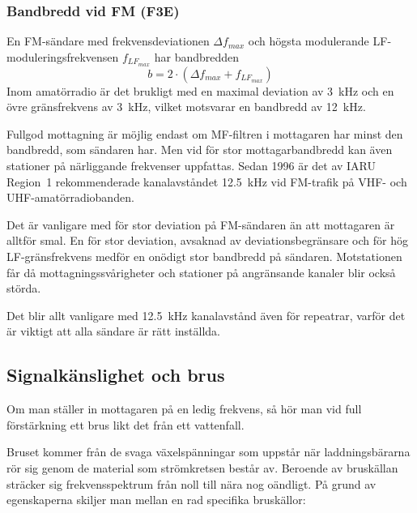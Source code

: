 \subsubsection{Bandbredd vid FM (F3E)}

En FM-sändare med frekvensdeviationen \(\Delta f_{max}\) och högsta
modulerande LF-moduleringsfrekvensen \(f_{LF_{max}}\) har bandbredden
\[ b = 2 \cdot (\Delta f_{max} + f_{LF_{max}}) \]
Inom amatörradio är det brukligt med en maximal deviation av \SI{3}{\kilo\hertz}
och en övre gränsfrekvens av \SI{3}{\kilo\hertz}, vilket motsvarar en bandbredd
av \SI{12}{\kilo\hertz}.

Fullgod mottagning är möjlig endast om MF-filtren i mottagaren har
minst den bandbredd, som sändaren har.
Men vid för stor mottagarbandbredd kan även stationer på närliggande frekvenser
uppfattas.
Sedan 1996 är det av IARU Region~1 rekommenderade kanalavståndet
\SI{12,5}{\kilo\hertz} vid FM-trafik på VHF- och UHF-amatörradiobanden.

Det är vanligare med för stor deviation på FM-sändaren än att
mottagaren är alltför smal.
En för stor deviation, avsaknad av deviationsbegränsare och för hög
LF-gränsfrekvens medför en onödigt stor bandbredd på sändaren.
Motstationen får då mottagningssvårigheter och stationer på angränsande
kanaler blir också störda.

Det blir allt vanligare med \SI{12,5}{\kilo\hertz} kanalavstånd även för
repeatrar, varför det är viktigt att alla sändare är rätt inställda.

\subsection{Signalkänslighet och brus}

Om man ställer in mottagaren på en ledig frekvens, så hör man vid full
förstärkning ett brus likt det från ett vattenfall.

Bruset kommer från de svaga växelspänningar som uppstår när
laddningsbärarna rör sig genom de material som strömkretsen består av.
Beroende av bruskällan sträcker sig frekvensspektrum från noll
till nära nog oändligt.
På grund av egenskaperna skiljer man mellan en rad specifika bruskällor:

